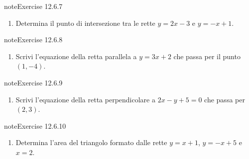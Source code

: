 \documentclass[letterpaper,10pt,italian]{jupyterBook}
\begin{document}
\begin{sphinxadmonition}{note}{Exercise 12.6.7}


\begin{enumerate}
%
\setcounter{enumi}{6}
\item {} 
\sphinxAtStartPar
Determina il punto di intersezione tra le rette \( y = 2x - 3 \) e \( y = -x + 1 \).

\end{enumerate}
\end{sphinxadmonition}
 \label{exercise:ch/analytic_geometry/analytic_geometry_2d/problems-exercise-7}

\begin{sphinxadmonition}{note}{Exercise 12.6.8}


\begin{enumerate}
%
\setcounter{enumi}{7}
\item {} 
\sphinxAtStartPar
Scrivi l’equazione della retta parallela a \( y = 3x + 2 \) che passa per il punto \( (1, -4) \).

\end{enumerate}
\end{sphinxadmonition}
 \label{exercise:ch/analytic_geometry/analytic_geometry_2d/problems-exercise-8}

\begin{sphinxadmonition}{note}{Exercise 12.6.9}


\begin{enumerate}
%
\setcounter{enumi}{8}
\item {} 
\sphinxAtStartPar
Scrivi l’equazione della retta perpendicolare a \( 2x - y + 5 = 0 \) che passa per \( (2, 3) \).

\end{enumerate}
\end{sphinxadmonition}
 \label{exercise:ch/analytic_geometry/analytic_geometry_2d/problems-exercise-9}

\begin{sphinxadmonition}{note}{Exercise 12.6.10}


\begin{enumerate}
%
\setcounter{enumi}{9}
\item {} 
\sphinxAtStartPar
Determina l’area del triangolo formato dalle rette \( y = x + 1 \), \( y = -x + 5 \) e \( x = 2 \).

\end{enumerate}
\end{sphinxadmonition}
\end{document}
